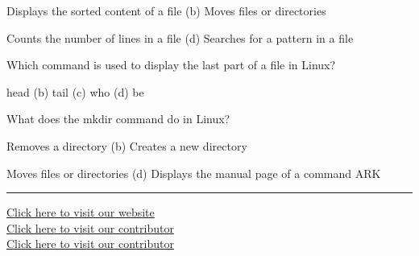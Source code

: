 \documentclass[11pt,a4paper]{article}
\begin{document}
\begin{parts}
\begin{parts}
  \end{parts}
  \item Displays the sorted content of a file (b) Moves files or directories
  \item Counts the number of lines in a file (d) Searches for a pattern in a file
  \begin{parts}
    \item Which command is used to display the last part of a file in Linux?
  \end{parts}
  \item head (b) tail (c) who (d) be
  \begin{parts}
    \item What does the mkdir command do in Linux?
  \end{parts}
  \item Removes a directory (b) Creates a new directory
  \item Moves files or directories (d) Displays the manual page of a command
  ARK
\end{parts}

\vfill
\rule{\linewidth}{0.4pt}
\begin{center}\small
\href{https://bhu-exam.vercel.app/}{Click here to visit our website}\\[4pt]\href{https://me-aryan.vercel.app/}{Click here to visit our contributor}\\[4pt]\href{https://quashan-me.vercel.app/}{Click here to visit our contributor}
\end{center}
\end{document}
